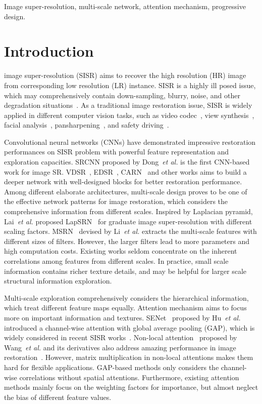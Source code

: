 \documentclass[journal]{IEEEtran}
\begin{document}
\begin{IEEEkeywords}
	Image super-resolution, multi-scale network, attention mechanism, progressive design.
\end{IEEEkeywords}


\IEEEpeerreviewmaketitle
	
\section{Introduction}
 image super-resolution (SISR) aims to recover the high resolution (HR) image from corresponding low resolution (LR) instance. SISR is a highly ill posed issue, which may comprehensively contain down-sampling, blurry, noise, and other degradation situations~\cite{review2_3}. As a traditional image restoration issue, SISR is widely applied in different computer vision tasks, such as video codec~\cite{tcsvt_1}, view synthesis~\cite{tcsvt_2}, facial analysis~\cite{tcsvt_3}, pansharpening~\cite{review2_5}, and safety driving~\cite{review2_4}. 

Convolutional neural networks (CNNs) have demonstrated impressive restoration performances on SISR problem with powerful feature representation and exploration capacities. SRCNN proposed by Dong~\textit{et al.} is the first CNN-based work for image SR. VDSR~\cite{vdsr}, EDSR~\cite{edsr_lim2017}, CARN~\cite{carn} and other works aims to build a deeper network with well-designed blocks for better restoration performance. Among different elaborate architectures, multi-scale design proves to be one of the effective network patterns for image restoration, which considers the comprehensive information from different scales. Inspired by Laplacian pyramid, Lai~\textit{et al.} proposed LapSRN~\cite{lapsrn} for graduate image super-resolution with different scaling factors. MSRN~\cite{msrn} devised by Li~\textit{et al.} extracts the multi-scale features with different sizes of filters. However, the larger filters lead to more parameters and high computation costs. 
Existing works seldom concentrate on the inherent correlations among features from different scales. In practice, small scale information contains richer texture details, and may be helpful for larger scale structural information exploration. 

Multi-scale exploration comprehensively considers the hierarchical information, which treat different feature maps equally. Attention mechanism aims to focus more on important information and textures. SENet~\cite{senet_hu2018} proposed by Hu~\textit{et al.} introduced a channel-wise attention with global average pooling (GAP), which is widely considered in recent SISR works~\cite{rcan, imdn_hui2019, san_dai2019}. Non-local attention~\cite{nonlocal2018wang} proposed by Wang~\textit{et al.} and its derivatives also address amazing performance in image restoration~\cite{san_dai2019}. However, matrix multiplication in non-local attentions makes them hard for flexible applications. GAP-based methods only considers the channel-wise correlations without spatial attentions. Furthermore, existing attention methods mainly focus on the weighting factors for importance, but almost neglect the bias of different feature values.
\end{document}
